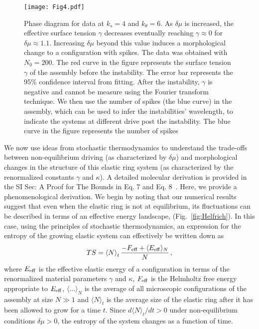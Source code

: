 \documentclass[amsmath,preprintnumbers,10pt,nofootinbib,prl,twocolumn]{revtex4-1}
\begin{document}
\begin{figure}[tbb]
\centering
\texttt{[image: Fig4.pdf]}
\caption{Phase diagram for data at $k_s=4$ and $k_\theta = 6$. As $\delta\mu$ is increased, the effective surface tension $\gamma$ decreases eventually reaching $\gamma\approx 0$ for $\delta\mu \approx 1.1$.  Increasing $\delta \mu$ beyond this value induces a morphological change to a configuration with spikes. The data was obtained with $N_0=200$. The red curve in the figure represents the surface tension $\gamma$ of the assembly before the instability. The error bar represents the 95\% confidence interval from fitting. After the instability, $\gamma$ is negative and cannot be measure using the Fourier transform technique. We then use the number of spikes (the blue curve) in the assembly, which can be used to infer the instabilities' wavelength, to indicate the systems at different drive post the instability. The blue curve in the figure represents the number of spikes} \label{fig:HelfrichInstability}
\end{figure}

 We now use ideas from stochastic thermodynamics to understand the trade-offs between non-equilibrium driving (as characterized by $\delta \mu$) and morphological changes in the structure of this elastic ring system (as characterized by the renormalized constants $\gamma$ and $\kappa$). A detailed molecular derivation is provided in the SI Sec: A Proof for The Bounds in Eq. 7 and Eq. 8~\cite{Supplementary}. Here, we provide a phenomenological derivation. We begin by noting that our numerical results suggest that even when the elastic ring is not at equilibrium, its fluctuations can be described in terms of an effective energy landscape, (Fig.~\ref{fig:Helfrich}). In this case, using the principles of stochastic thermodynamics, an expression for the entropy of the growing elastic system can effectively be written down as~\cite{Nguyen2016,Esposito2012}
\begin{equation}
\label{eq:entropysystem}
 TS=\left\langle N \right\rangle_t \frac{-F_{\rm{eff}} + \langle E_{\rm{eff}} \rangle _N}{N}\,,
\end{equation}
where $E_{\rm{eff}}$ is the effective elastic energy of a configuration in terms of the renormalized material parameters $\gamma$ and $\kappa$, $F_{\rm{eff}}$ is the Helmholtz free energy appropriate to $E_{\rm{eff}}$, $\langle...\rangle_N$ is the average of all microscopic configurations of the assembly at size $N\gg 1$ and $\langle N \rangle_t$ is the average size of the elastic ring after it has been allowed to grow for a time $t$. Since $d\langle N \rangle_t/dt > 0$ under non-equilibrium conditions $\delta\mu >0$, the entropy of the system changes as a function of time. 
\end{document}
